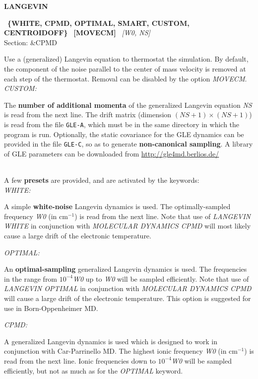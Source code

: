 \documentclass[twoside,10pt,titlepage,a4paper]{article}
\newcommand{\reflabel}[1]{\hypertarget{#1}}
\newcommand{\reflabel}[1]{\label{#1}}
\newcommand{\htref}[2]{\href{#1}{#2}}
\newcommand{\htref}[2]{\htmladdnormallink{#2}{#1}}
\newcommand{\keyword}[5]{%
\vspace{1.0cm}
\begin{minipage}{15cm}
\reflabel{#1}{\textbf{\large #1}}%
\index{#1}%
\ \textbf{#2}%
\ \textbf{#3}%
\ \textit{#4}%
     \hfill\\\smallskip
     {Section: #5}
     \hfill\\\smallskip\vskip 10pt
\end{minipage}
}%
\newcommand{\desc}[1]{%
   \hspace*{\fill} \parbox{130mm}{\sloppy
                          {#1}%
                             }
     \hfill\\\smallskip
   }%
\newcommand{\desc}[1]{#1\vspace{1ex}}
\begin{document}
\keyword{LANGEVIN}{\{WHITE, CPMD, OPTIMAL, SMART, CUSTOM, CENTROIDOFF\}}{[MOVECM]}{[W0, NS]}{\&CPMD}
  \desc{Use a (generalized) Langevin equation to thermostat the simulation\cite{Ceriotti10}. 
   By default, the component of the noise parallel to the center of mass velocity is 
     removed at each step of the thermostat. Removal can be disabled by the option {\sl MOVECM}.
    \\\smallskip
    {\sl CUSTOM:} \hfill\begin{minipage}[t]{10cm}
                  The {\bf number of additional momenta} of the generalized Langevin equation
                  {\sl NS} is read from the next line. The drift matrix 
                  (dimension $(NS+1)\times(NS+1)$) is read from the file \texttt{GLE-A},
                  which must be in the same directory in which the program is run. 
                  Optionally, the static covariance for the GLE dynamics can be provided
                  in the file \texttt{GLE-C}, so as to generate {\bf non-canonical sampling}. 
                  A library of GLE parameters can be downloaded from 
                  \htref{http://gle4md.berlios.de/}{http://gle4md.berlios.de/}
                      \end{minipage}
   \smallskip\\ A few {\bf presets} are provided, and are activated by the keywords:\\
    {\sl WHITE:} \hfill\begin{minipage}[t]{10cm}
                  A simple {\bf white-noise} Langevin dynamics is used. The optimally-sampled
                  frequency {\sl W0} (in cm$^{-1}$) is read from the next line. Note that use of 
                  {\sl LANGEVIN WHITE} in conjunction with {\sl MOLECULAR DYNAMICS CPMD} 
                  will most likely cause a large drift of the electronic temperature.
                      \end{minipage}
    {\sl OPTIMAL:} \hfill\begin{minipage}[t]{10cm}
                  An {\bf optimal-sampling} generalized Langevin dynamics is used. 
                  The frequencies in the range from $10^{-4}${\sl W0} up to {\sl W0}
                  will be sampled efficiently. Note that use of 
                  {\sl LANGEVIN OPTIMAL} in conjunction with {\sl MOLECULAR DYNAMICS CPMD} 
                  will cause a large drift of the electronic temperature.
                  This option is suggested for use in Born-Oppenheimer MD.
                      \end{minipage}
    {\sl CPMD:} \hfill\begin{minipage}[t]{10cm}
                  A generalized Langevin dynamics is used which is designed to 
                  work in conjunction with Car-Parrinello MD. 
                  The highest ionic frequency {\sl W0} (in cm$^{-1}$) is read from the 
                  next line. Ionic frequencies down to $10^{-4}${\sl W0} will be sampled 
                  efficiently, but not as much as for the {\sl OPTIMAL} keyword. 
                      \end{minipage}
                      
}
\end{document}
